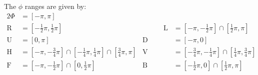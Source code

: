 The $\phi$ ranges are given by:
\begin{alignat}{2}
  \Phi
    &= [-\pi, \pi] && \nonumber\\
  \text{R}
    &= \left[-\tfrac{1}{2}\pi, \tfrac{1}{2}\pi\right] &\qquad\quad
  \text{L}
    &= \left[-\pi, -\tfrac{1}{2}\pi\right]
       \cap \left[\tfrac{1}{2}\pi, \pi\right] \nonumber\\
  \text{U}
    &= [0, \pi] &
  \text{D}
    &= [-\pi, 0] \nonumber\\
  \text{H}
    &= \left[-\pi, -\tfrac{3}{4}\pi\right]
       \cap \left[-\tfrac{1}{4}\pi, \tfrac{1}{4}\pi\right]
       \cap \left[\tfrac{3}{4}\pi, \pi\right] &
  \text{V}
    &= \left[-\tfrac{3}{4}\pi, -\tfrac{1}{4}\pi\right]
       \cap \left[\tfrac{1}{4}\pi, \tfrac{3}{4}\pi\right] \\
  \text{F}
    &= \left[-\pi, -\tfrac{1}{2}\pi\right]
       \cap \left[0, \tfrac{1}{2}\pi\right] &
  \text{B}
    &= \left[-\tfrac{1}{2}\pi, 0\right]
       \cap \left[\tfrac{1}{2}\pi, \pi\right] \nonumber
  \label{eq:phiRanges}
\end{alignat}
\begin{center}
  \resizebox{0.25\textwidth}{!}{}\hspace{0.05\textwidth}%
  \resizebox{0.25\textwidth}{!}{}\\\vspace{0.05\textwidth}%
  \resizebox{0.25\textwidth}{!}{}\hspace{0.05\textwidth}%
  \resizebox{0.25\textwidth}{!}{}
\end{center}

